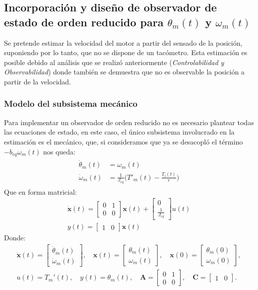 \documentclass[12pt, a4paper,journal, onecolumn, compsoc]{IEEEtran}
\begin{document}
\subsection{Incorporación y diseño de observador de estado de orden reducido para $\theta_m(t)$ y $\omega_m(t)$}
Se pretende estimar la velocidad del motor a partir del sensado de la posición, suponiendo por lo tanto, que no se dispone de un tacómetro. Esta estimación es posible debido al análisis que se realizó anteriormente (\textit{Controlabilidad y Observabilidad}) donde también se demuestra que no es observable la posición a partir de la velocidad.
\subsubsection{Modelo del subsistema mecánico}
Para implementar un observador de orden reducido no es necesario plantear todas las ecuaciones de estado, en este caso, el único subsistema involucrado en la estimación es el mecánico, que, si consideramos que ya se desacopló el término $-b_{eq}\omega_m(t)$ nos queda:
\begin{gather}
\begin{aligned}
    \dot\theta_m(t) &= \omega_m(t) \\
    \dot \omega_m(t) &= \frac{1}{J_{eq}}\Big(T'_m(t)-\frac{T_l(t)}{r}\Big)
\end{aligned}
\end{gather}
Que en forma matricial:
\begin{gather*}
    \bm{\dot x}(t)
=
\begin{bmatrix}
    0 & 1 \\ 0 & 0
\end{bmatrix}
\bm{x}(t)
+
\begin{bmatrix}
    0 \\ \frac{1}{J_{eq}} 
\end{bmatrix}
    u(t)
\\
y(t) =
\begin{bmatrix}
    1 & 0
\end{bmatrix}
\bm{x}(t)
\end{gather*}
Donde:
\begin{gather*}
\bm{\dot x}(t)=
\begin{bmatrix}
    \dot\theta_m(t) \\ \dot\omega_m(t)
\end{bmatrix},
\quad
\bm{x}(t)=
\begin{bmatrix}
    \theta_m(t) \\ \omega_m(t)
\end{bmatrix},
\quad
\bm{x}(0)=
\begin{bmatrix}
    \theta_m(0) \\ \omega_m(0)
\end{bmatrix}, \\[6pt]
u(t)=T_m'(t),
\quad
y(t)=\theta_m(t),
\quad
\bm{A}=\begin{bmatrix}
    0 & 1\\ 0 & 0
\end{bmatrix},
\quad
\bm{C}=\begin{bmatrix}
    1 & 0
\end{bmatrix}.
\end{gather*}
    
\end{document}
